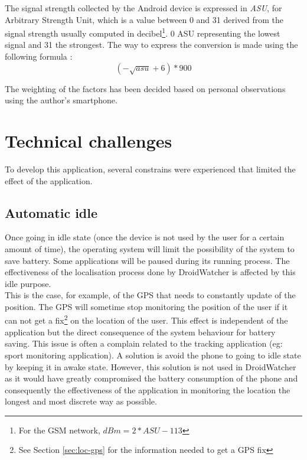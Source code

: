 The signal strength collected by the Android device is expressed in \emph{ASU}, for Arbitrary Strength Unit, which is a value between 0 and 31 derived from the signal strength usually computed in decibel\footnote{For the GSM network, $dBm = 2 * ASU - 113$}.
0 ASU representing the lowest signal and 31 the strongest.
The way to express the conversion is made using the following formula :\\

\[
 (-\sqrt{asu}+6)*900
\]

The weighting of the factors has been decided based on personal observations using the author's smartphone.

\section{Technical challenges}

To develop this application, several constrains were experienced that limited the effect of the application.

\subsection{Automatic idle}

Once going in idle state (once the device is not used by the user for a certain amount of time), the operating system will limit the possibility of the system to save battery.
Some applications will be paused during its running process.
The effectiveness of the localisation process done by DroidWatcher is affected by this idle purpose.\\

This is the case, for example, of the GPS that needs to constantly update of the position.
The GPS will sometime stop monitoring the position of the user if it can not get a fix\footnote{See Section \ref{sec:loc-gps} for the information needed to get a GPS fix} on the location of the user.
This effect is independent of the application but the direct consequence of the system behaviour for battery saving. 
This issue is often a complain related to the tracking application (eg: sport monitoring application).
A solution is avoid the phone to going to idle state by keeping it in awake state.
However, this solution is not used in DroidWatcher as it would have greatly compromised the battery consumption  of the phone and consequently the effectiveness of the application in monitoring the location the longest and most discrete way as possible.

